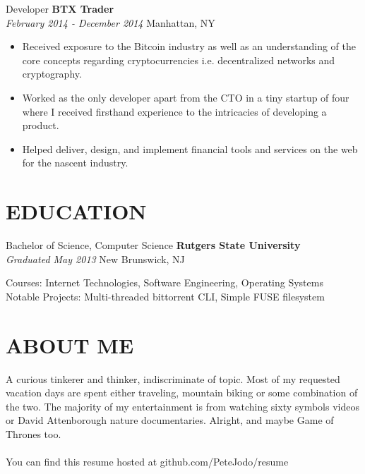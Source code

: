 \documentclass[margin]{res}
\begin{document}
\begin{resume}
	Developer \hfill \textbf{BTX Trader} \\
	\textsl{February 2014 - December 2014} \hfill Manhattan, NY

    \begin{itemize} \itemsep -2pt %
    \item Received exposure to the Bitcoin industry as well as an understanding of the core concepts regarding cryptocurrencies i.e. decentralized networks and cryptography.
    \item Worked as the only developer apart from the CTO in a tiny startup of four where I received firsthand experience to the intricacies of developing a product.
    \item Helped deliver, design, and implement financial tools and services on the web for the nascent industry.
    \end{itemize}

\section{EDUCATION}
    Bachelor of Science, Computer Science \hfill \textbf{Rutgers State University} \\
    \textsl{Graduated May 2013} \hfill New Brunswick, NJ

    Courses: {\small Internet Technologies, Software Engineering, Operating Systems} \\
    Notable Projects: {\small Multi-threaded bittorrent CLI, Simple FUSE filesystem}

\section{ABOUT ME}
    A curious tinkerer and thinker, indiscriminate of topic. Most of my requested vacation days are spent either traveling, mountain biking or some combination of the two. The majority of my entertainment is from watching sixty symbols videos or David Attenborough nature documentaries. Alright, and maybe Game of Thrones too. \\
    \\
    {\small You can find this resume hosted at github.com/PeteJodo/resume}


\end{resume}
\end{document}
